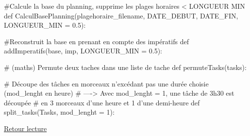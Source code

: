 \documentclass[12pt]{article}
\newenvironment{code}%
   {\snugshade\verbatim}%
   {\endverbatim\endsnugshade}
\begin{document}
\begin{code}
#Calcule la base du planning, supprime les plages horaires < LONGUEUR MIN
def CalculBasePlanning(plagehoraire_filename, DATE_DEBUT, DATE_FIN, LONGUEUR_MIN = 0.5):


#Reconstruit la base en prenant en compte des impératifs
def addImperatifs(base, imp, LONGUEUR_MIN = 0.5):


# (maths) Permute deux taches dans une liste de tache
def permuteTasks(tasks):


# Découpe des tâches en morceaux n'excédant pas une durée choisie (mod_lenght en heure)
# ----> Avec mod_lenght = 1, une tâche de 3h30 est découpée
#       en 3 morceaux d'une heure et 1 d'une demi-heure
def split_tasks(Tasks, mod_lenght = 1):

\end{code}



\hyperlink{ref14}{Retour lecture}
\end{document}
